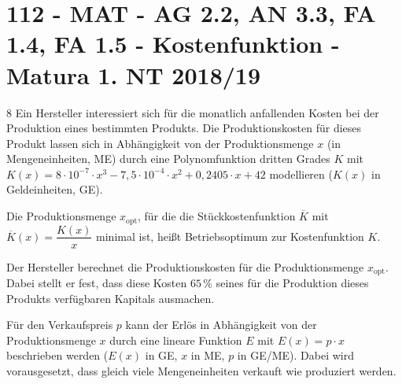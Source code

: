 \section{112 - MAT - AG 2.2, AN 3.3, FA 1.4, FA 1.5 - Kostenfunktion - Matura 1. NT 2018/19}

\begin{langesbeispiel} \item[8] %
Ein Hersteller interessiert sich für die monatlich anfallenden Kosten bei der Produktion eines bestimmten Produkts. Die Produktionskosten für dieses Produkt lassen sich in Abhängigkeit von der Produktionsmenge $x$ (in Mengeneinheiten, ME) durch eine Polynomfunktion dritten Grades $K$ mit\\ 
$K(x)=8\cdot 10^{-7}\cdot x^3-7,5\cdot 10^{-4}\cdot x^2+0,2405\cdot x+42$ modellieren ($K(x)$ in Geldeinheiten, GE).%

\begin{aufgabenstellung}
\item %


\item Die Produktionsmenge $x_\text{opt}$, für die die Stückkostenfunktion $\overline{K}$ mit\\ 
$\overline{K}(x)=\dfrac{K(x)}{x}$ minimal ist, heißt Betriebsoptimum zur Kostenfunktion $K$.%


Der Hersteller berechnet die Produktionskosten für die Produktionsmenge $x_\text{opt}$. Dabei stellt er fest, dass diese Kosten $65\,\%$ seines für die Produktion dieses Produkts verfügbaren Kapitals ausmachen.


\item Für den Verkaufspreis $p$ kann der Erlös in Abhängigkeit von der Produktionsmenge $x$ durch eine lineare Funktion $E$ mit $E(x)=p\cdot x$ beschrieben werden ($E(x)$ in GE, $x$ in ME, $p$ in GE/ME). Dabei wird vorausgesetzt, dass gleich viele Mengeneinheiten verkauft wie produziert werden.%


\end{aufgabenstellung}
\end{langesbeispiel}
